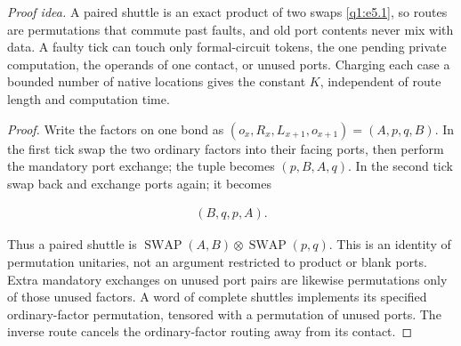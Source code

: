 \par\noindent\emph{Proof idea.} A paired shuttle is an exact product of two swaps \eqref{q1:e5.1}, so routes are permutations that commute past faults, and old port contents never mix with data. A faulty tick can touch only formal-circuit tokens, the one pending private computation, the operands of one contact, or unused ports. Charging each case a bounded number of native locations gives the constant \(K\), independent of route length and computation time.

\begin{proof}

Write the factors on one bond as \((o_{x},R_{x},L_{x+1},o_{x+1})=(A,p,q,B)\). In the first tick swap the two ordinary factors into their facing ports, then perform the mandatory port exchange; the tuple becomes \((p,B,A,q)\). In the second tick swap back and exchange ports again; it becomes

\begin{equation}\label{q1:e5.1}
\begin{gathered}
(B,q,p,A).
\end{gathered}
\end{equation}

Thus a paired shuttle is \(\operatorname{SWAP}(A,B)\otimes\operatorname{SWAP}(p,q)\). This is an identity of permutation unitaries, not an argument restricted to product or blank ports. Extra mandatory exchanges on unused port pairs are likewise permutations only of those unused factors. A word of complete shuttles implements its specified ordinary-factor permutation, tensored with a permutation of unused ports. The inverse route cancels the ordinary-factor routing away from its contact.


\end{proof}

